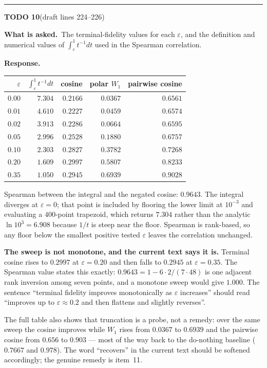 \documentclass[11pt]{article}
\newenvironment{todoitem}[2]{%
  \par\medskip\noindent\rule{\textwidth}{0.7pt}\par\nobreak\smallskip
  \noindent\textbf{\large TODO #1}\quad\textnormal{\small(draft #2)}\par\nobreak\smallskip
}{\par\medskip}
\newcommand{\ask}[1]{\noindent\textbf{What is asked.}\ #1\par\smallskip}
\newcommand{\resp}[1]{\noindent\textbf{Response.}\ #1\par}
\begin{document}
\begin{todoitem}{10}{lines 224--226}
\ask{The terminal-fidelity values for each $\varepsilon$, and the definition and numerical values
of $\int_\varepsilon^1 t^{-1}dt$ used in the Spearman correlation.}

\resp{\begin{center}
\small
\begin{tabular}{@{}rrrrr@{}}
\toprule
$\varepsilon$ & $\int_\varepsilon^1 t^{-1}dt$ & cosine & polar $W_1$ & pairwise cosine\\
\midrule
$0.00$ & $7.304$ & $0.2166$ & $0.0367$ & $0.6561$\\
$0.01$ & $4.610$ & $0.2227$ & $0.0459$ & $0.6574$\\
$0.02$ & $3.913$ & $0.2286$ & $0.0664$ & $0.6595$\\
$0.05$ & $2.996$ & $0.2528$ & $0.1880$ & $0.6757$\\
$0.10$ & $2.303$ & $0.2827$ & $0.3782$ & $0.7268$\\
$0.20$ & $1.609$ & $0.2997$ & $0.5807$ & $0.8233$\\
$0.35$ & $1.050$ & $0.2945$ & $0.6939$ & $0.9028$\\
\bottomrule
\end{tabular}
\end{center}

Spearman between the integral and the negated cosine: $0.9643$. The integral diverges at
$\varepsilon=0$; that point is included by flooring the lower limit at $10^{-3}$ and evaluating a
$400$-point trapezoid, which returns $7.304$ rather than the analytic $\ln 10^{3}=6.908$ because
$1/t$ is steep near the floor. Spearman is rank-based, so any floor below the smallest positive
tested $\varepsilon$ leaves the correlation unchanged.

\textbf{The sweep is not monotone, and the current text says it is.} Terminal cosine rises to
$0.2997$ at $\varepsilon=0.20$ and then falls to $0.2945$ at $\varepsilon=0.35$. The Spearman
value states this exactly: $0.9643=1-6\cdot 2/(7\cdot 48)$ is one adjacent rank inversion among
seven points, and a monotone sweep would give $1.000$. The sentence ``terminal fidelity improves
monotonically as $\varepsilon$ increases'' should read ``improves up to $\varepsilon\approx0.2$
and then flattens and slightly reverses''.

The full table also shows that truncation is a probe, not a remedy: over the same sweep the
cosine improves while $W_1$ rises from $0.0367$ to $0.6939$ and the pairwise cosine from $0.656$
to $0.903$ --- most of the way back to the do-nothing baseline ($0.7667$ and $0.978$). The word
``recovers'' in the current text should be softened accordingly; the genuine remedy is item~11.}
\end{todoitem}
\end{document}
